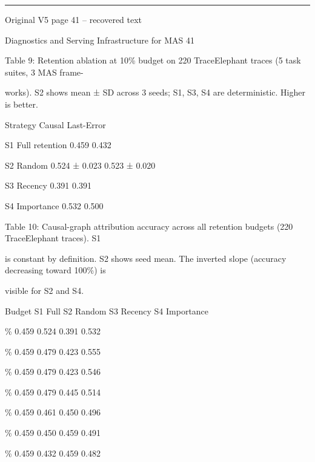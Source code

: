 \par\smallskip\noindent\rule{\textwidth}{0.4pt}\par{\sffamily\footnotesize Original V5 page 41 -- recovered text}\par\begin{flushleft}\footnotesize\ttfamily
\par\smallskip
\par\smallskip
\noindent Diagnostics and Serving Infrastructure for MAS 41\par
\par\smallskip
\par\smallskip
\noindent Table 9: Retention ablation at 10\% budget on 220 TraceElephant traces (5 task suites, 3 MAS frame-\par
\noindent works). S2 shows mean ± SD across 3 seeds; S1, S3, S4 are deterministic. Higher is better.\par
\par\smallskip
\noindent  Strategy Causal Last-Error\par
\noindent  S1 Full retention 0.459 0.432\par
\noindent  S2 Random 0.524 ± 0.023 0.523 ± 0.020\par
\noindent  S3 Recency 0.391 0.391\par
\noindent  S4 Importance 0.532 0.500\par
\par\smallskip
\noindent Table 10: Causal-graph attribution accuracy across all retention budgets (220 TraceElephant traces). S1\par
\noindent is constant by definition. S2 shows seed mean. The inverted slope (accuracy decreasing toward 100\%) is\par
\noindent visible for S2 and S4.\par
\par\smallskip
\noindent  Budget S1 Full S2 Random S3 Recency S4 Importance\par
{}\% 0.459 0.524 0.391 0.532\par
{}\% 0.459 0.479 0.423 0.555\par
{}\% 0.459 0.479 0.423 0.546\par
{}\% 0.459 0.479 0.445 0.514\par
{}\% 0.459 0.461 0.450 0.496\par
{}\% 0.459 0.450 0.459 0.491\par
{}\% 0.459 0.432 0.459 0.482\par

\end{flushleft}

